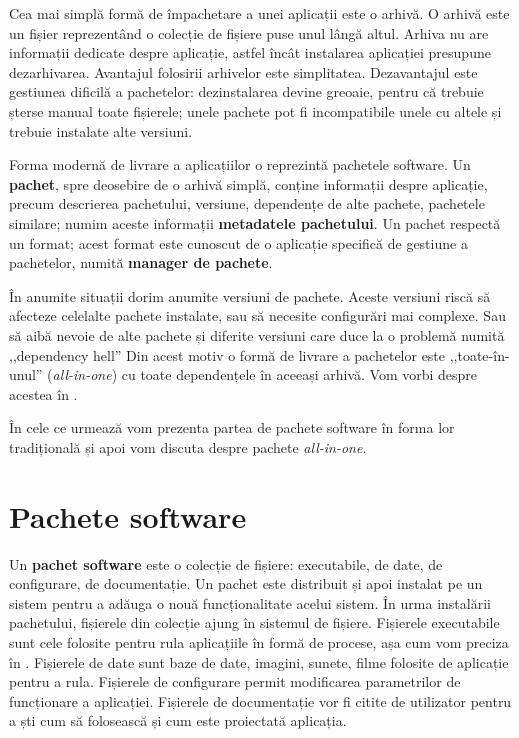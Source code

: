 Cea mai simplă formă de împachetare a unei aplicații este o arhivă.
O arhivă este un fișier reprezentând o colecție de fișiere puse unul lângă altul.
Arhiva nu are informații dedicate despre aplicație, astfel încât instalarea aplicației presupune dezarhivarea.
Avantajul folosirii arhivelor este simplitatea.
Dezavantajul este gestiunea dificilă a pachetelor: dezinstalarea devine greoaie, pentru că trebuie șterse manual toate fișierele;
unele pachete pot fi incompatibile unele cu altele și trebuie instalate alte versiuni.

Forma modernă de livrare a aplicațiilor o reprezintă pachetele software.
Un \textbf{pachet}, spre deosebire de o arhivă simplă, conține informații despre aplicație, precum descrierea pachetului, versiune, dependențe de alte pachete, pachetele similare;
numim aceste informații \textbf{metadatele pachetului}.
Un pachet respectă un format;
acest format este cunoscut de o aplicație specifică de gestiune a pachetelor, numită \textbf{manager de pachete}.

În anumite situații dorim anumite versiuni de pachete.
Aceste versiuni riscă să afecteze celelalte pachete instalate, sau să necesite configurări mai complexe.
Sau să aibă nevoie de alte pachete și diferite versiuni care duce la o problemă numită ,,dependency hell'' Din acest motiv o formă de livrare a pachetelor este ,,toate-în-unul'' (\textit{all-in-one}) cu toate dependențele în aceeași arhivă.
Vom vorbi despre acestea în .

În cele ce urmează vom prezenta partea de pachete software în forma lor tradițională și apoi vom discuta despre pachete \textit{all-in-one}.

\section{Pachete software}
\label{sec:package:overview}

Un \textbf{pachet software} este o colecție de fișiere: executabile, de date, de configurare, de documentație.
Un pachet este distribuit și apoi instalat pe un sistem pentru a adăuga o nouă funcționalitate acelui sistem.
În urma instalării pachetului, fișierele din colecție ajung în sistemul de fișiere.
Fișierele executabile sunt cele folosite pentru rula aplicațiile în formă de procese, așa cum vom preciza în .
Fișierele de date sunt baze de date, imagini, sunete, filme folosite de aplicație pentru a rula.
Fișierele de configurare permit modificarea parametrilor de funcționare a aplicației.
Fișierele de documentație vor fi citite de utilizator pentru a ști cum să folosească și cum este proiectată aplicația.

